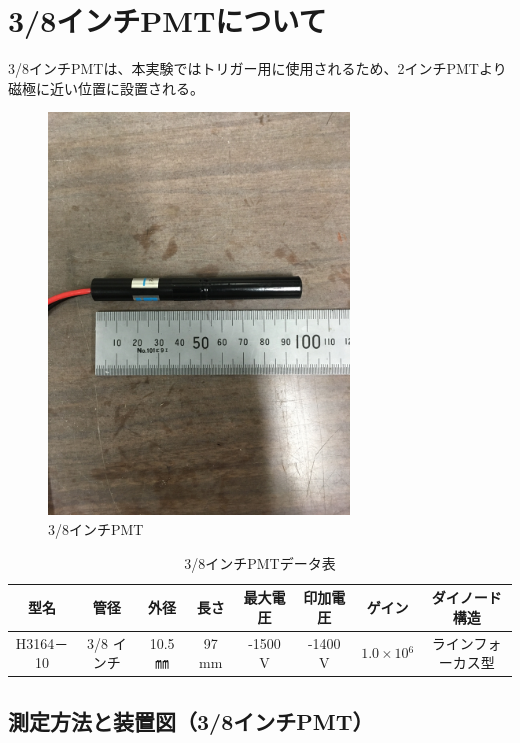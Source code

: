 \section{3/8インチPMTについて}
3/8インチPMTは、本実験ではトリガー用に使用されるため、2インチPMTより磁極に近い位置に設置される。
\begin{figure}[H]
	\centering
		\includegraphics[width=8cm]{fig/iguchi/miniPMT.jpg}
	\caption{3/8インチPMT}
	\label{3/8inch}
\end{figure}
\begin{table}[htb]
	\begin{center}
	
	  \begin{tabular}{|c|c|c|c|c|c|c|c|} \hline
		型名& 管径 & 外径 & 長さ & 最大電圧 & 印加電圧 & ゲイン & ダイノード構造 \\ \hline \hline
		H3164－10 & 3/8 インチ & 10.5 ㎜ & 97 mm & -1500 V & -1400 V & $1.0\times10{^{6}}$ &ラインフォーカス型 \\ \hline
	\end{tabular}
	  \caption{3/8インチPMTデータ表}
	\end{center}
\end{table}


\subsection{測定方法と装置図（3/8インチPMT）}

